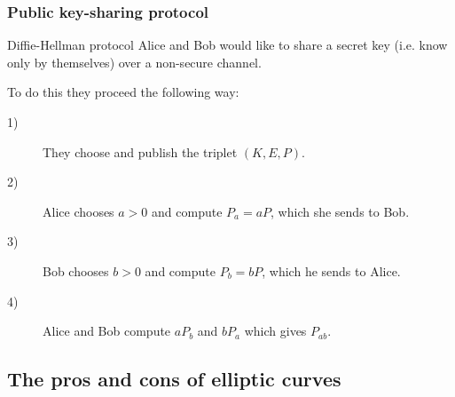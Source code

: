 \begin{frame}[t]
    \frametitle{Public key-sharing protocol}
    \begin{exampleblock}{Diffie-Hellman protocol}
        Alice and Bob would like to share a secret key (i.e. know only by themselves) over a non-secure channel.

        To do this they proceed the following way:
        \begin{description}
            \item[1)] 
                They choose and publish the triplet $\left( K,E,P \right) $.

            \item[2)] Alice chooses $a>0$ and compute $P_{a} =
                aP$, which she sends to Bob.

            \item[3)] Bob chooses $b>0$ and compute $P_{b} =
                bP$, which he sends to Alice.
                \item[4)] Alice and Bob compute $aP_{b}$ and $bP_{a}$ which gives $P_{ab}$.
        \end{description}
    \end{exampleblock}
\end{frame}

\subsection{The pros and cons of elliptic curves}

